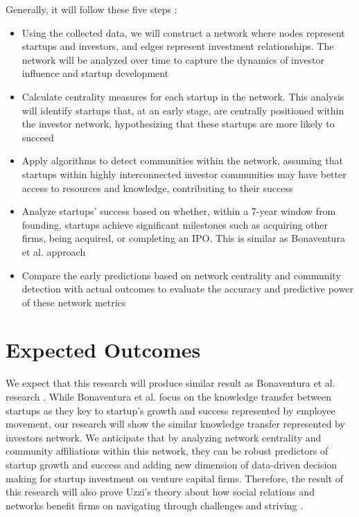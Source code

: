 \documentclass[a4paper,11pt]{article}
\begin{document}
Generally, it will follow these five steps : 
\begin{itemize}
    \item Using the collected data, we will construct a network where nodes represent startups and investors, and edges represent investment relationships. The network will be analyzed over time to capture the dynamics of investor influence and startup development
    \item Calculate centrality measures for each startup in the network. This analysis will identify startups that, at an early stage, are centrally positioned within the investor network, hypothesizing that these startups are more likely to succeed
    \item Apply algorithms to detect communities within the network, assuming that startups within highly interconnected investor communities may have better access to resources and knowledge, contributing to their success
    \item Analyze startups' success based on whether, within a 7-year window from founding, startups achieve significant milestones such as acquiring other firms, being acquired, or completing an IPO. This is similar as Bonaventura et al. approach \cite{bonaventura2020a}
    \item Compare the early predictions based on network centrality and community detection with actual outcomes to evaluate the accuracy and predictive power of these network metrics
\end{itemize}

\section{Expected Outcomes}
We expect that this research will produce similar result as Bonaventura et al. research \cite{bonaventura2020a}. While Bonaventura et al. focus on the knowledge transfer between startups as they key to startup's growth and success represented by employee movement, our research will show the similar knowledge transfer represented by investors network. We anticipate that by analyzing network centrality and community affiliations within this network, they can be robust predictors of startup growth and success and adding new dimension of data-driven decision making for startup investment on venture capital firms. Therefore, the result of this research will also prove Uzzi's theory about how social relations and networks benefit firms on navigating through challenges and striving \cite{uzzi2021a}.
\end{document}
